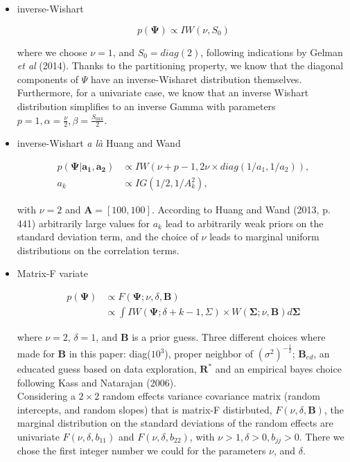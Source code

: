 \documentclass[a4paper]{article}
\begin{document}
\begin{itemize}
	\item inverse-Wishart
	
\begin{equation}
p(\bm{\Psi}) \propto IW(\nu, S_{0})
\end{equation}	

where we choose $\nu = 1$, and $S_{0}=diag(2)$, following indications by Gelman \textit{et al} (2014). Thanks to the partitioning property, we know that the diagonal components of $\Psi$ have an inverse-Wisharet distribution themselves. Furthermore, for a univariate case, we know that an inverse Wishart distribution simplifies to an inverse Gamma with parameters $p=1, \alpha=\frac{\nu}{2}, \beta = \frac{S_{0kk}}{2}$.

	\item inverse-Wishart \textit{a là} Huang and Wand

\begin{equation}
	\begin{split}
	p(\bm{\Psi|a_1, a_2})& \propto IW(\nu + p - 1, 2\nu \times diag(1/a_1, 1/a_2)), \\
	a_k& \propto IG(1/2,1/A_k^2),
	\end{split}
\end{equation}

with $\nu = 2$ and $\bm{A} = [100, 100]$. According to Huang and Wand (2013, p. 441) arbitrarily large values for $a_k$ lead to arbitrarily weak priors on the standard deviation term, and the choice of $\nu$ leads to marginal uniform distributions on the correlation terms.
	
	\item Matrix-F variate
	
\begin{equation}
\begin{split}
p(\bm{\Psi})& \propto F(\bm{\Psi}; \nu, \delta, \bm{B}) \\
& \propto \int IW(\bm{\Psi}; \delta + k - 1, \Sigma) \times W(\bm{\Sigma}; \nu, \bm{B})d\bm{\Sigma}
\end{split}
\end{equation}	

where $\nu = 2$, $\delta = 1$, and $\bm{B}$ is a prior guess. Three different choices where made for $\bm{B}$ in this paper: diag($10^3$), proper neighbor of $(\sigma^2)^{-\frac{1}{2}}$; $\bm{B}_{ed}$, an educated guess based on data exploration, $\bm{R^*}$ and an empirical bayes choice following Kass and Natarajan (2006). \\
Considering a $2 \times 2$ random effects variance covariance matrix (random intercepts, and random slopes) that is matrix-F distirbuted, $F(\nu, \delta, \bm{B})$, the marginal distribution on the standard deviations of the random effects are univariate $F(\nu, \delta, b_{11})$ and $F(\nu, \delta, b_{22})$, with $\nu >1, \delta > 0, b_{jj} > 0$. There we chose the first integer number we could for the parameters $\nu$, and $\delta$.
\end{itemize}
\end{document}
